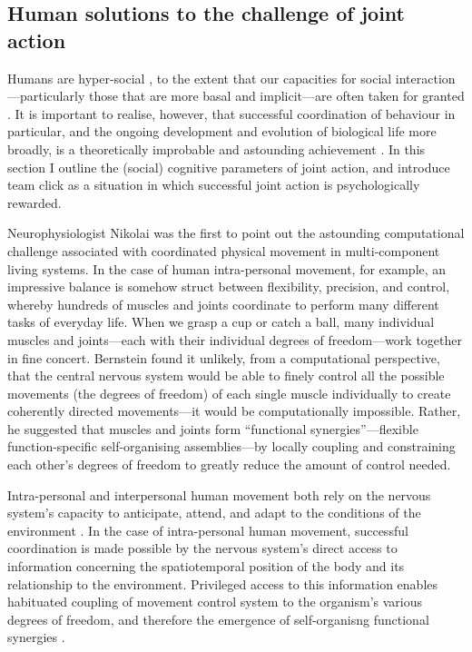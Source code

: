\begin{CJK}{UTF8}{gbsn}
\section{Human solutions to the challenge of joint action\label{sect:dfProblem}}
Humans are hyper-social \citep{Tomasello2012a}, to the extent that our capacities for social interaction---particularly those that are more basal and implicit---are often taken for granted \citep{Wheatley2016}.  It is important to realise, however, that successful coordination of behaviour in particular, and the ongoing development and evolution of biological life more broadly, is a theoretically improbable and astounding achievement \citep{Schrodinger1944}.  In this section I outline the (social) cognitive parameters of joint action, and introduce team click as a situation in which successful joint action is psychologically rewarded.

Neurophysiologist Nikolai \textcite{Bernstein1967} was the first to point out the astounding computational challenge associated with coordinated physical movement in multi-component living systems.  In the case of human intra-personal movement, for example, an impressive balance is somehow struct between flexibility, precision, and control, whereby hundreds of muscles and joints coordinate to perform many different tasks of everyday life.  When we grasp a cup or catch a ball, many individual muscles and joints---each with their individual degrees of freedom---work together in fine concert.  Bernstein found it unlikely, from a computational perspective, that the central nervous system would be able to finely control all the possible movements (the degrees of freedom) of each single muscle individually to create coherently directed movements---it would be computationally impossible.  Rather, he suggested that muscles and joints form  ``functional synergies''---flexible function-specific self-organising assemblies---by locally coupling and constraining each other’s degrees of freedom to greatly reduce the amount of control needed.

Intra-personal and interpersonal human movement both rely on the nervous system’s capacity to anticipate, attend, and adapt to the conditions of the environment \citep{Keller2014}.  In the case of intra-personal human movement, successful coordination is made possible by the nervous system's direct access to information concerning the spatiotemporal position of the body and its relationship to the environment.  Privileged access to this information enables habituated coupling of movement control system to the organism's various degrees of freedom, and therefore the emergence of self-organisng functional synergies \citep{Riley2011}.


\end{CJK}
